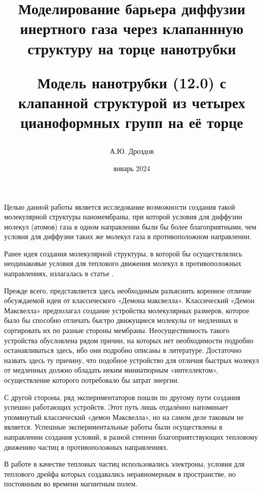 \documentclass[12pt]{article}
\begin{document}
\title{Моделирование барьера диффузии инертного газа через клапаннную структуру на торце нанотрубки

Модель нанотрубки (12.0) с клапанной структурой из четырех цианоформных групп на её торце}
\author{А.Ю. Дроздов}
\date{январь 2024}

\begin{titlepage}
\maketitle
\end{titlepage}

Целью данной работы является исследование возможности создания такой молекулярной структуры наномембраны, при которой условия для диффузии молекул (атомов) газа в одном направлении были бы более благоприятными, чем условия для диффузии таких же молекул газа в противоположном направлении.

Ранее идея создания молекулярной структуры, в которой бы осуществлялись неодинаковые условия для теплового движения молекул в противоположных направлениях, излагалась в статье \cite{Drozdov2001}.

Прежде всего, представляется здесь необходимым разъяснить коренное отличие обсуждаемой идеи от классического «Демона максвелла». Классический «Демон Максвелла» предполагал создание устройства молекулярных размеров, которое было бы способно отличать быстро движущиеся молекулы от медленных и сортировать их по разные стороны мембраны. Неосуществимость такого устройства обусловлена рядом причин, на которых нет необходимости подробно останавливаться здесь, ибо они подробно описаны в литературе. Достаточно назвать здесь ту причину, что подобное устройство для отличия быстрых молекул от медленных должно обладать неким миниатюрным «интеллектом», осуществление которого потребовало бы затрат энергии. 

С другой стороны, ряд экспериментаторов пошли по другому пути создания успешно работающих устройств. Этот путь лишь отдалённо напоминает упомянутый классический «демон Максвелла», но на самом деле таковым не является. Успешные экспериментальные работы были осуществлены в направлении создания условий, в разной степени благоприятствующих тепловому движению частиц в противоположных направлениях. 

В работе \cite{Lavrentjev1992} в качестве тепловых частиц использовались электроны, условия для теплового дрейфа которых создавались неравномерным в пространстве, но постоянным во времени магнитным полем. 
\end{document}
